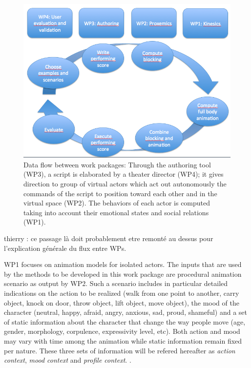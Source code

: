 \begin{figure}[htbp]
\begin{center}
\includegraphics[width=\linewidth]{DADAWORKFLOW.png}
\caption{Data flow between work packages: Through the authoring tool (WP3), a script is elaborated by a theater director (WP4); it gives direction to group of virtual
actors which act out autonomously the commands of the script to position toward each other and in the virtual space (WP2). The behaviors of each actor is computed 
taking into account their emotional states and social relations (WP1).}
\label{default}
\end{center}
\end{figure}



\begin{xcomment}  
thierry : ce passage là doit probablement etre remonté au dessus pour l'explication générale du flux entre WPs. 
\end{xcomment}



WP1 focuses on animation models for isolated actors.  The inputs that are used by the methods to be developed in this work package are procedural animation scenario as output by WP2.  Such a scenario includes in particular detailed indications on the action to be realized (walk from one point to another, carry object, knock on door, throw object, lift object, move object), the mood of the character (neutral, happy, afraid, angry, anxious, sad, proud, shameful) and a set of static information about the character that change the way people move (age, gender, morphology, corpulence, expressivity level, etc). Both action and mood may vary with time among the animation while static information remain fixed per nature.  These three sets of information will be refered hereafter as \textit{action context}, \textit{mood context} and \textit{profile context}. . 

